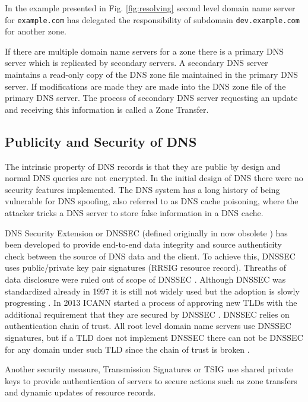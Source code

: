 In the example presented in Fig. \ref{fig:resolving} second level domain name server for \texttt{example.com} has delegated the responsibility of subdomain \texttt{dev.example.com} for another zone.

If there are multiple domain name servers for a zone there is a primary DNS server which is replicated by secondary servers. A secondary DNS server maintains a read-only copy of the DNS zone file maintained in the primary DNS server. If modifications are made they are made into the DNS zone file of the primary DNS server. The process of secondary DNS server requesting an update and receiving this information is called a Zone Transfer. \citep{tanenbaum}

\subsection{Publicity and Security of DNS}
\label{sec:dns_security}


The intrinsic property of DNS records is that they are public by design and normal DNS queries are not encrypted. In the initial design of DNS there were no security features implemented. The DNS system has a long history of being vulnerable for DNS spoofing, also referred to as DNS cache poisoning, where the attacker tricks a DNS server to store false information in a DNS cache. \cite{tanenbaum}\cite{RFC_threat_analysis} 

DNS Security Extension or DNSSEC (defined originally in now obsolete \cite{RFC_2065}) has been developed to provide end-to-end data integrity and source authenticity check between the source of DNS data and the client. To achieve this, DNSSEC uses public/private key pair signatures (RRSIG resource record). Threaths of data disclosure were ruled out of scope of DNSSEC \cite{RFC_threat_analysis}. Although DNSSEC was standardized already in 1997 it is still not widely used but the adoption is slowly progressing \cite{lotr}. In 2013 ICANN started a process of approving new TLDs with the additional requirement that they are secured by DNSSEC \cite{sweden}. DNSSEC relies on authentication chain of trust. All root level domain name servers use DNSSEC signatures, but if a TLD does not implement DNSSEC there can not be DNSSEC for any domain under such TLD since the chain of trust is broken \cite{lotr}.

Another security measure, Transmission Signatures or TSIG \cite{RFC_2845_trans_sec} use shared private keys to provide authentication of servers to secure actions such as zone transfers and dynamic updates of resource records.


